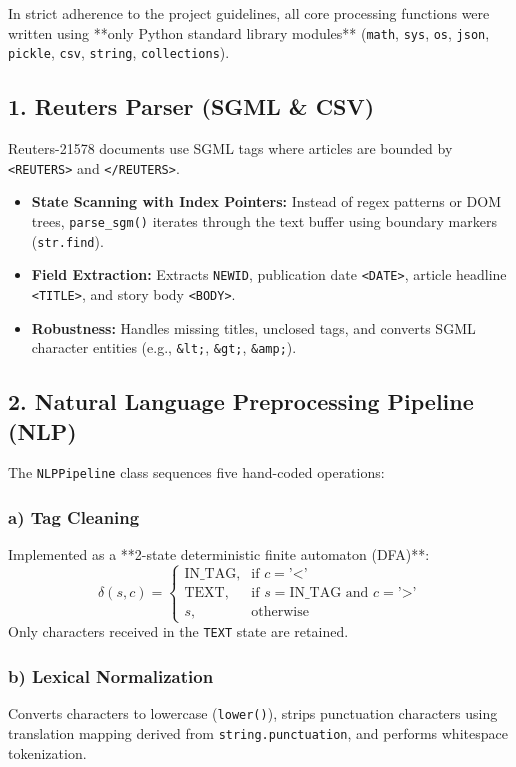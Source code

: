 \documentclass[11pt,a4paper]{article}
\begin{document}
In strict adherence to the project guidelines, all core processing functions were written using **only Python standard library modules** (\texttt{math}, \texttt{sys}, \texttt{os}, \texttt{json}, \texttt{pickle}, \texttt{csv}, \texttt{string}, \texttt{collections}).

\subsection{1. Reuters Parser (SGML \& CSV)}
Reuters-21578 documents use SGML tags where articles are bounded by \texttt{<REUTERS>} and \texttt{</REUTERS>}.
\begin{itemize}
    \item \textbf{State Scanning with Index Pointers:} Instead of regex patterns or DOM trees, \texttt{parse\_sgm()} iterates through the text buffer using boundary markers (\texttt{str.find}).
    \item \textbf{Field Extraction:} Extracts \texttt{NEWID}, publication date \texttt{<DATE>}, article headline \texttt{<TITLE>}, and story body \texttt{<BODY>}.
    \item \textbf{Robustness:} Handles missing titles, unclosed tags, and converts SGML character entities (e.g., \texttt{\&lt;}, \texttt{\&gt;}, \texttt{\&amp;}).
\end{itemize}

\subsection{2. Natural Language Preprocessing Pipeline (NLP)}
The \texttt{NLPPipeline} class sequences five hand-coded operations:

\subsubsection{a) Tag Cleaning}
Implemented as a **2-state deterministic finite automaton (DFA)**:
\begin{equation}
\delta(s, c) = \begin{cases} 
\text{IN\_TAG}, & \text{if } c = \text{'<'} \\
\text{TEXT}, & \text{if } s = \text{IN\_TAG and } c = \text{'>'} \\
s, & \text{otherwise}
\end{cases}
\end{equation}
Only characters received in the \texttt{TEXT} state are retained.

\subsubsection{b) Lexical Normalization}
Converts characters to lowercase (\texttt{lower()}), strips punctuation characters using translation mapping derived from \texttt{string.punctuation}, and performs whitespace tokenization.
\end{document}
